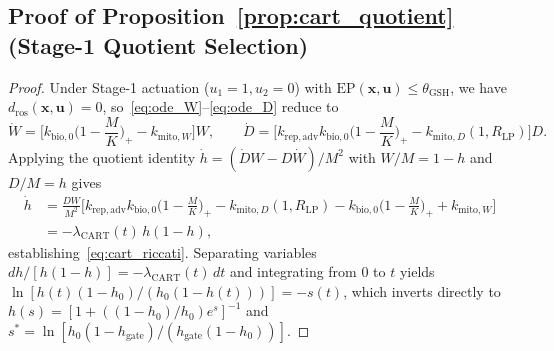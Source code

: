 \documentclass[11pt]{article}
\theoremstyle{plain}
\theoremstyle{remark}
\begin{document}
\subsection{Proof of Proposition~\ref{prop:cart_quotient} (Stage-1 Quotient Selection)}
\label{app:quotient}
\begin{proof}
Under Stage-1 actuation ($u_1 = 1, u_2 = 0$) with $\mathrm{EP}(\mathbf{x}, \mathbf{u}) \le \theta_{\mathrm{GSH}}$, we have $d_{\mathrm{ros}}(\mathbf{x}, \mathbf{u}) = 0$, so~\eqref{eq:ode_W}--\eqref{eq:ode_D} reduce to
\begin{equation}
  \dot{W} = \Big[k_{\mathrm{bio},0}\Big(1 - \frac{M}{K}\Big)_+ - k_{\mathrm{mito},W}\Big]W, \qquad
  \dot{D} = \Big[k_{\mathrm{rep,adv}} k_{\mathrm{bio},0}\Big(1 - \frac{M}{K}\Big)_+ - k_{\mathrm{mito},D}(1, R_{\mathrm{LP}})\Big]D.
\end{equation}
Applying the quotient identity $\dot{h} = (\dot{D}W - D\dot{W})/M^2$ with $W/M = 1 - h$ and $D/M = h$ gives
\begin{align}
  \dot{h} &= \frac{DW}{M^2}\Big[k_{\mathrm{rep,adv}} k_{\mathrm{bio},0}\Big(1 - \frac{M}{K}\Big)_+ - k_{\mathrm{mito},D}(1, R_{\mathrm{LP}}) - k_{\mathrm{bio},0}\Big(1 - \frac{M}{K}\Big)_+ + k_{\mathrm{mito},W}\Big] \nonumber\\
  &= -\lambda_{\mathrm{CART}}(t)\,h(1 - h),
\end{align}
establishing~\eqref{eq:cart_riccati}. Separating variables $dh/[h(1-h)] = -\lambda_{\mathrm{CART}}(t)\,dt$ and integrating from $0$ to $t$ yields $\ln[h(t)(1 - h_0)/(h_0(1 - h(t)))] = -s(t)$, which inverts directly to $h(s) = [1 + ((1 - h_0)/h_0)e^s]^{-1}$ and $s^* = \ln[h_0(1 - h_{\mathrm{gate}})/(h_{\mathrm{gate}}(1 - h_0))]$.
\end{proof}
\end{document}
